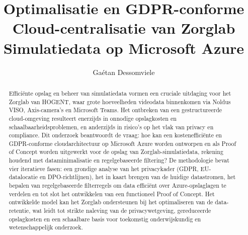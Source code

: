 \documentclass{hogent-article}
\title{Optimalisatie en GDPR-conforme Cloud-centralisatie van Zorglab Simulatiedata op Microsoft Azure}
\author{Gaétan Dessomviele}
\begin{document}
\begin{abstract}
  Efficiënte opslag en beheer van simulatiedata vormen een cruciale uitdaging voor het Zorglab van HOGENT, waar grote hoeveelheden videodata binnenkomen via Noldus VISO, Axis-camera's en Microsoft Teams. Het ontbreken van een gestructureerde cloud-omgeving resulteert enerzijds in onnodige opslagkosten en schaalbaarheidsproblemen, en anderzijds in risico's op het vlak van privacy en compliance. Dit onderzoek beantwoordt de vraag: hoe kan een kostenefficiënte en GDPR-conforme cloudarchitectuur op Microsoft Azure worden ontworpen en als Proof of Concept worden uitgewerkt voor de opslag van Zorglab-simulatiedata, rekening houdend met dataminimalisatie en regelgebaseerde filtering? De methodologie bevat vier iteratieve fasen: een grondige analyse van het privacykader (GDPR, EU-datalocatie en DPO-richtlijnen), het in kaart brengen van de huidige datastromen, het bepalen van regelgebaseerde filterregels om data efficiënt over Azure-opslaglagen te verdelen en tot slot het ontwikkelen van een functioneel Proof of Concept. Het ontwikkelde model kan het Zorglab ondersteunen bij het optimaliseren van de data-retentie, wat leidt tot strikte naleving van de privacywetgeving, gereduceerde opslagkosten en een schaalbare basis voor toekomstig onderwijskundig en wetenschappelijk onderzoek.
\end{abstract}

\tableofcontents



\printbibliography[heading=bibintoc]
\end{document}

